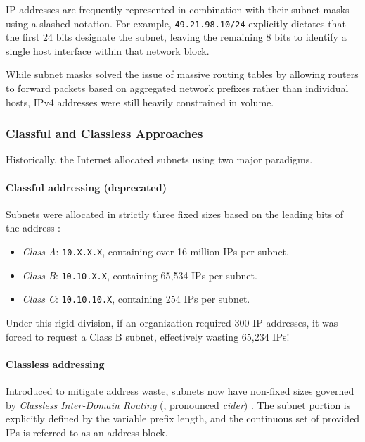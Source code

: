 IP addresses are frequently represented in combination with their subnet masks using a slashed notation. For example, \texttt{49.21.98.10/24} explicitly dictates that the first 24 bits designate the subnet, leaving the remaining 8 bits to identify a single host interface within that network block.

While subnet masks solved the issue of massive routing tables by allowing routers to forward packets based on aggregated network prefixes rather than individual hosts, IPv4 addresses were still heavily constrained in volume.

\subsubsection{Classful and Classless Approaches}
Historically, the Internet allocated subnets using two major paradigms.

\paragraph{Classful addressing (deprecated)} 
Subnets were allocated in strictly three fixed sizes based on the leading bits of the address \cite{rfc791}:
\begin{itemize}
    \item \emph{Class A}: \texttt{10.X.X.X}, containing over 16 million IPs per subnet.
    \item \emph{Class B}: \texttt{10.10.X.X}, containing 65,534 IPs per subnet.
    \item \emph{Class C}: \texttt{10.10.10.X}, containing 254 IPs per subnet.
\end{itemize}
Under this rigid division, if an organization required 300 IP addresses, it was forced to request a Class B subnet, effectively wasting 65,234 IPs!
    
\paragraph{Classless addressing} 
Introduced to mitigate address waste, subnets now have non-fixed sizes governed by \emph{Classless Inter-Domain Routing} (, pronounced \emph{cider}) \cite{rfc4632}. 
The subnet portion is explicitly defined by the variable prefix length, and the continuous set of provided IPs is referred to as an address block.

